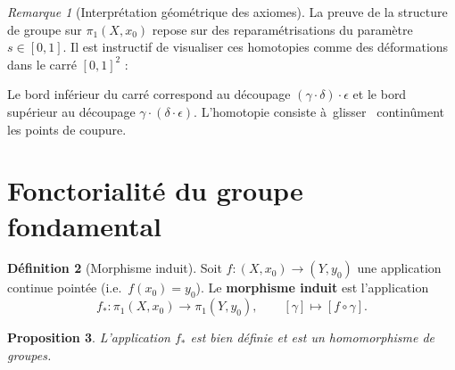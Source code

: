 \documentclass[12pt,a4paper,openany]{book}
\theoremstyle{definition}
\newtheorem{definition}{Définition}[chapter]
\theoremstyle{plain}
\newtheorem{proposition}[definition]{Proposition}
\theoremstyle{remark}
\newtheorem{remarque}[definition]{Remarque}
\providecommand{\og}{\guillemotleft\,}
\providecommand{\fg}{\,\guillemotright}
\begin{document}
\begin{remarque}[Interprétation géométrique des axiomes]\label{rem:interpretation-geometrique}
La preuve de la structure de groupe sur $\pi_1(X, x_0)$ repose sur des
reparamétrisations du paramètre $s \in [0,1]$. Il est instructif de visualiser
ces homotopies comme des déformations dans le carré $[0,1]^2$ :

\begin{center}
\end{center}

Le bord inférieur du carré correspond au découpage $(\gamma \cdot \delta) \cdot
\epsilon$ et le bord supérieur au découpage $\gamma \cdot (\delta \cdot \epsilon)$.
L'homotopie consiste à \og glisser \fg{} continûment les points de coupure.
\end{remarque}

\section{Fonctorialité du groupe fondamental}\label{sec:fonctorialite}

\begin{definition}[Morphisme induit]\label{def:morphisme-induit-pi1}
Soit $f : (X, x_0) \to (Y, y_0)$ une application continue pointée (i.e.\
$f(x_0) = y_0$). Le \textbf{morphisme induit} est l'application
\[
f_* : \pi_1(X, x_0) \longrightarrow \pi_1(Y, y_0), \qquad [\gamma] \longmapsto [f \circ \gamma].
\]
\end{definition}

\begin{proposition}\label{prop:f-star-bien-defini}
L'application $f_*$ est bien définie et est un homomorphisme de groupes.
\end{proposition}
\end{document}
